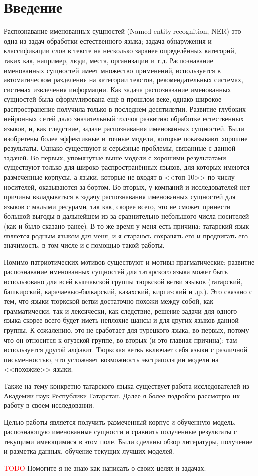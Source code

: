 \section{Введение}

Распознавание именованных сущностей (Named entity recognition, NER) это одна из задач обработки естественного языка; задача обнаружения и классификации слов в тексте на несколько заранее определённых категорий, таких как, например, люди, места, организации и т.д. Распознавание именованных сущностей имеет множество применений, используется в автоматическом разделении на категории текстов, рекомендательных системах, системах извлечения информации. Как задача распознавание именованных сущностей была сформулирована ещё в прошлом веке, однако широкое распространение получила только в последнем десятилетии. Развитие глубоких нейронных сетей дало значительный толчок развитию обработке естественных языков, и, как следствие, задаче распознавания именованных сущностей. Были изобретены более эффективные и точные модели, которые показывают хорошие результаты. Однако существуют и серьёзные проблемы, связанные с данной задачей. Во-первых, упомянутые выше модели с хорошими результатами существуют только для широко распространённых языков, для которых имеются размеченные корпусы, а языки, которые не входят в <<топ-10>> по числу носителей, оказываются за бортом. Во-вторых, у компаний и исследователей нет причины вкладываться в задачу распознавания именованных сущностей для языков с малыми ресурами, так как, скорее всего, это не сможет принести большой выгоды в дальнейшем из-за сравнительно небольшого числа носителей (как и было сказано ранее). В то же время у меня есть причина: татарский язык является родным языком для меня, и я стараюсь сохранять его и продвигать его значимость, в том числе и с помощью такой работы.

Помимо патриотических мотивов существуют и мотивы прагматические: развитие распознавание именованных сущностей для татарского языка может быть использовано для всей кыпчакской группы тюркской ветви языков (татарский, башкирский, карачаевыо-балкарский, казахский, киргизский и др.). Это связано с тем, что языки тюркской ветви достаточно похожи между собой, как грамматически, так и лексически, как следствие, решение задачи для одного языка скорее всего будет иметь неплохие шансы и для других языков данной группы. К сожалению, это не сработает для турецкого языка, во-первых, потому что он относится к огузской группе, во-вторых (и это главная причина): там используется другой алфавит. Тюркская ветвь включает себя языки с различной письменностью, что усложняет возможность экстраполяции модели на <<похожие>> языки.

Также на тему конкретно татарского языка существует работа \cite{Nevzorova} исследователей из Академии наук Республики Татарстан. Далее я более подробно рассмотрю их работу в своем исследовании.

Целью работы является получить размеченный корпус и обученную модель, распознающую именованные сущности и сравнить полученные результаты с текущими имеющимися в этом поле. Были сделаны обзор литературы, получение и разметка данных, обучение текущих лучших моделей. 

\textcolor{red}{TODO} Помогите я не знаю как написать о своих целях и задачах.